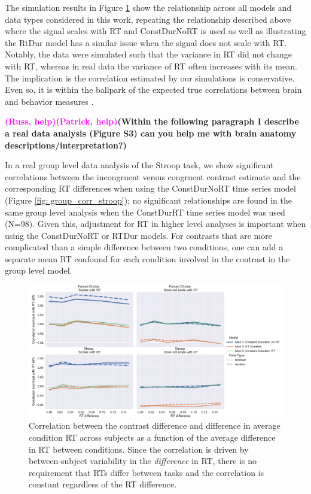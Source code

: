\documentclass[titlepage,12pt] {article}
\newcommand{\rh}{\textcolor{magenta}{\textbf{(Russ, help)}}}
\newcommand{\ph}{\textcolor{magenta}{\textbf{(Patrick, help)}}}
\begin{document}
The simulation results in Figure \ref{fig:rt-cor} show the relationship across all models and data types considered in this work, repeating the relationship described above where the signal scales with RT and ConstDurNoRT is used as well as illustrating the RtDur model has a similar issue when the signal does not scale with RT.   Notably, the data were simulated such that the variance in RT did not change with RT, whereas in real data the variance of RT often increases with its mean.  The implication is the correlation estimated by our simulations is conservative.  Even so, it is within the ballpark of the expected true correlations between brain and behavior measures \citep{marekReproducibleBrainwideAssociation2022}.  

\rh\ph\textbf{(Within the following paragraph I describe a real data analysis (Figure S3) can you help me with brain anatomy descriptions/interpretation?)} 

In a real group level data analysis of the Stroop task, we show significant correlations between the incongruent versus congruent contrast estimate and the corresponding RT differences when using the ConstDurNoRT time series model  (Figure \ref{fig: group_corr_stroop}); no significant relationships are found in the same group level analysis when the ConstDurRT time series model was used (N=98).  Given this, adjustment for RT in higher level analyses is important when using the ConstDurNoRT or RTDur models.  For contrasts that are more complicated than a simple difference between two conditions, one can add a separate mean RT confound for each condition involved in the contrast in the group level model.


\begin{figure}
  \centering
   \includegraphics[width=5in]{Figures/cor_with_rt.pdf}
   \caption{Correlation between the contrast difference and difference in average condition RT across subjects as a function of the average difference in RT between conditions.  Since the correlation is driven by between-subject variability in the \emph{difference} in RT, there is no requirement that RTs differ between tasks and the correlation is constant regardless of the RT difference. }
  \label{fig:rt-cor}
\end{figure}
\end{document}
